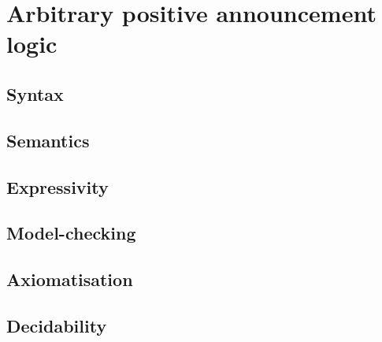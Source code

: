 \chapter{Arbitrary positive announcement logic}\label{papal}

\section{Syntax}

\section{Semantics}

\section{Expressivity}

\section{Model-checking}

\section{Axiomatisation}

\section{Decidability}
